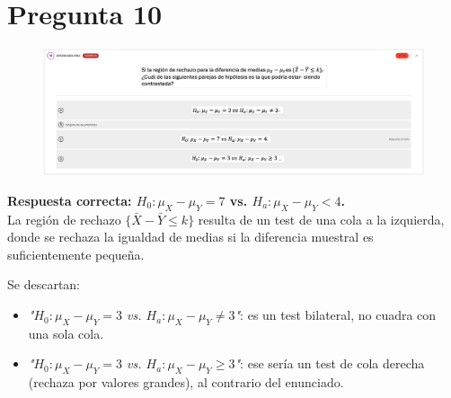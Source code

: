 \documentclass[10pt]{article}
\begin{document}
\section{Pregunta 10}
\begin{figure}[H]
    \centering
    \includegraphics[width=1\textwidth]{images/pregunta10.png}
\end{figure}

\textbf{Respuesta correcta: \(H_0: \mu_X - \mu_Y = 7\) vs. \(H_a: \mu_X - \mu_Y < 4\).}  \\
La región de rechazo \(\{\bar X - \bar Y \le k\}\) resulta de un test de una cola a la izquierda, donde se rechaza la igualdad de medias si la diferencia muestral es suficientemente pequeña.  

Se descartan:
\begin{itemize}
  \item \textit{"\(H_0: \mu_X - \mu_Y = 3\) vs. \(H_a: \mu_X - \mu_Y \neq 3\)"}: es un test bilateral, no cuadra con una sola cola.  
  \item \textit{"\(H_0: \mu_X - \mu_Y = 3\) vs. \(H_a: \mu_X - \mu_Y \ge 3\)"}: ese sería un test de cola derecha (rechaza por valores grandes), al contrario del enunciado.
\end{itemize}
\end{document}
